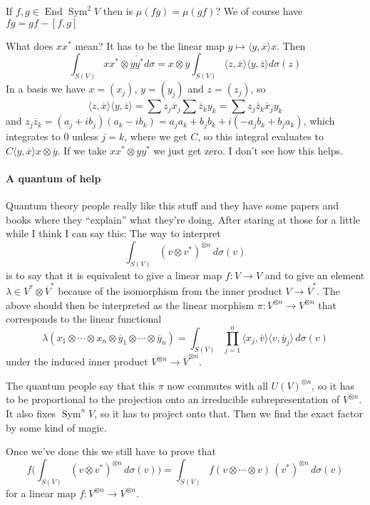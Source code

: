 \documentclass[11pt]{amsart}
\theoremstyle{definition}
\def\ov#1{\overline{#1}}
\DeclareMathOperator{\End}{End}
\DeclareMathOperator{\Sym}{Sym}
\begin{document}
If $f,g \in \End \Sym^2 V$ then is $\mu(fg) = \mu(gf)$?
We of course have $fg = gf - [f, g]$

What does $xx^*$ mean?
It has to be the linear map $y \mapsto \langle y, \ov x \rangle x$.
Then
$$
\int_{S(V)} x x^* \otimes \ov{yy^*} d\sigma
= x \otimes \ov y \int_{S(V)}
\langle z, \ov x \rangle \langle y, \ov z \rangle d\sigma(z)
$$
In a basis we have $x = (x_j)$, $y = (y_j)$ and $z = (z_j)$, so
$$
\langle z, \ov x \rangle \langle y, \ov z \rangle
= \sum z_j \ov x_j \sum \ov z_k y_k
= \sum z_j \ov z_k \ov x_j y_k
$$
and $z_j \ov z_k = (a_j + ib_j)(a_k - ib_k) = a_ja_k + b_j b_k + i(- a_jb_k +
b_j a_k)$, which integrates to $0$ unless $j = k$, where we get $C$, so this
integral evaluates to $C \langle y, \ov x \rangle x \otimes \ov y$.
If we take $xx^* \otimes yy^*$ we just get zero.
I don't see how this helps.


\paragraph{A quantum of help}

Quantum theory people really like this stuff and they have some papers and
books where they ``explain'' what they're doing.
After staring at those for a little while I think I can say this:
The way to interpret
$$
\int_{S(V)} (v \otimes v^*)^{\otimes n} \, d\sigma(v)
$$
is to say that it is equivalent to give a linear map $f : V \to V$ and to give
an element $\lambda \in V^* \otimes \ov V^*$ because of the isomorphism from
the inner product $V \to \ov V^*$.
The above should then be interpreted as the linear morphism
$\pi : V^{\otimes n} \to V^{\otimes n}$
that corresponds to the linear functional
$$
\lambda(x_1 \otimes \cdots \otimes x_n
\otimes
\ov y_1 \otimes \cdots \otimes \ov y_n)
=
\int_{S(V)} \prod_{j=1}^n
\langle x_j, \ov v \rangle \langle v , \ov y_j \rangle \, d\sigma(v)
$$
under the induced inner product $V^{\otimes n} \to \ov V^{\otimes n}$.

The quantum people say that this $\pi$ now commutes with all $U(V)^{\otimes n}$,
so it has to be proportional to the projection onto an irreducible
subrepresentation of $V^{\otimes n}$.
It also fixes $\Sym^n V$, so it has to project onto that.
Then we find the exact factor by some kind of magic.

Once we've done this we still have to prove that
$$
f\biggl(
\int_{S(V)} (v \otimes v^*)^{\otimes n} \, d\sigma(v)
\biggr)
= \int_{S(V)} f(v \otimes \cdots \otimes v) \, (v^*)^{\otimes n} \, d\sigma(v)
$$
for a linear map $f : V^{\otimes n} \to V^{\otimes n}$.
\end{document}
